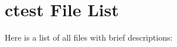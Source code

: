 \section{ctest File List}
Here is a list of all files with brief descriptions:\begin{CompactList}
\item{}
\item{}
\end{CompactList}
